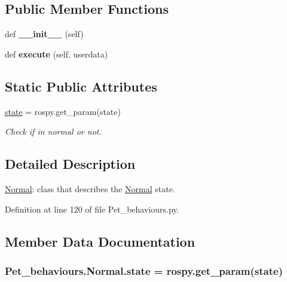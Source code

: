 \subsection*{Public Member Functions}
\begin{DoxyCompactItemize}
\item 
def {\bfseries \+\_\+\+\_\+init\+\_\+\+\_\+} (self)\hypertarget{classPet__behaviours_1_1Normal_a04301ed05d5952e591268a758309862b}{}\label{classPet__behaviours_1_1Normal_a04301ed05d5952e591268a758309862b}

\item 
def {\bfseries execute} (self, userdata)\hypertarget{classPet__behaviours_1_1Normal_a2bbd4605a4cdc6dc02f5e80af5b614a0}{}\label{classPet__behaviours_1_1Normal_a2bbd4605a4cdc6dc02f5e80af5b614a0}

\end{DoxyCompactItemize}
\subsection*{Static Public Attributes}
\begin{DoxyCompactItemize}
\item 
\hyperlink{classPet__behaviours_1_1Normal_a8a500787fd6cc1891b861a4d11e8ca7f}{state} = rospy.\+get\+\_\+param(\textquotesingle{}state\textquotesingle{})
\begin{DoxyCompactList}\small\item\em Check if in normal or not. \end{DoxyCompactList}\end{DoxyCompactItemize}


\subsection{Detailed Description}
\hyperlink{classPet__behaviours_1_1Normal}{Normal}\+: class that describes the \hyperlink{classPet__behaviours_1_1Normal}{Normal} state. 

Definition at line 120 of file Pet\+\_\+behaviours.\+py.



\subsection{Member Data Documentation}
\subsubsection[{\texorpdfstring{state}{state}}]{\setlength{\rightskip}{0pt plus 5cm}Pet\+\_\+behaviours.\+Normal.\+state = rospy.\+get\+\_\+param(\textquotesingle{}state\textquotesingle{})\hspace{0.3cm}{\ttfamily [static]}}\hypertarget{classPet__behaviours_1_1Normal_a8a500787fd6cc1891b861a4d11e8ca7f}{}\label{classPet__behaviours_1_1Normal_a8a500787fd6cc1891b861a4d11e8ca7f}


